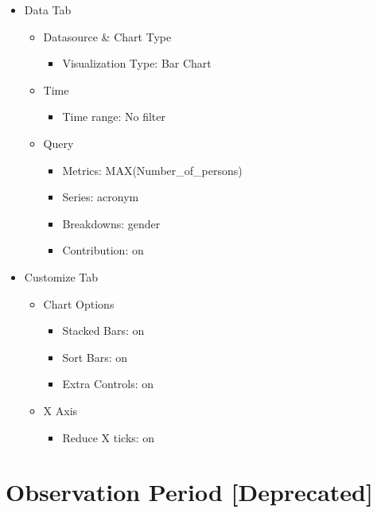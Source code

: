 \documentclass[
]{book}
\providecommand{\tightlist}{%
  \setlength{\itemsep}{0pt}\setlength{\parskip}{0pt}}
\begin{document}
\begin{itemize}
\tightlist
\item
  Data Tab

  \begin{itemize}
  \tightlist
  \item
    Datasource \& Chart Type

    \begin{itemize}
    \tightlist
    \item
      Visualization Type: Bar Chart
    \end{itemize}
  \item
    Time

    \begin{itemize}
    \tightlist
    \item
      Time range: No filter
    \end{itemize}
  \item
    Query

    \begin{itemize}
    \tightlist
    \item
      Metrics: MAX(Number\_of\_persons)
    \item
      Series: acronym
    \item
      Breakdowns: gender
    \item
      Contribution: on
    \end{itemize}
  \end{itemize}
\item
  Customize Tab

  \begin{itemize}
  \tightlist
  \item
    Chart Options

    \begin{itemize}
    \tightlist
    \item
      Stacked Bars: on
    \item
      Sort Bars: on
    \item
      Extra Controls: on
    \end{itemize}
  \item
    X Axis

    \begin{itemize}
    \tightlist
    \item
      Reduce X ticks: on
    \end{itemize}
  \end{itemize}
\end{itemize}

\hypertarget{observation-period-deprecated}{%
\section{Observation Period {[}Deprecated{]}}\label{observation-period-deprecated}}
\end{document}
